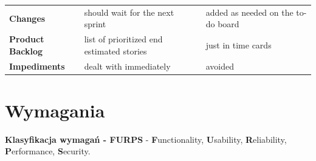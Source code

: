 \documentclass[a4paper]{article}
\begin{document}
\begin{table}[H]
\begin{center}
\begin{tabular}{| p{3cm} | p{6cm} p{6cm} |}
                \cmidrule(r){1-1}\cmidrule(rl){2-2}\cmidrule(l){3-3}
                \textbf{Changes} & should wait for the next sprint & added as needed on the to-do board\\

                \cmidrule(r){1-1}\cmidrule(rl){2-2}\cmidrule(l){3-3}
                \textbf{Product Backlog} & list of prioritized end estimated stories & just in time cards\\

                \cmidrule(r){1-1}\cmidrule(rl){2-2}\cmidrule(l){3-3}
                \textbf{Impediments} & dealt with immediately & avoided\\

                \bottomrule
            \end{tabular}
        \end{center}
    \end{table}


    \section{Wymagania}
    \textbf{Klasyfikacja wymagań - FURPS} - \textbf{F}unctionality, \textbf{U}sability, \textbf{R}eliability,
    \textbf{P}erformance, \textbf{S}ecurity.
\end{document}
